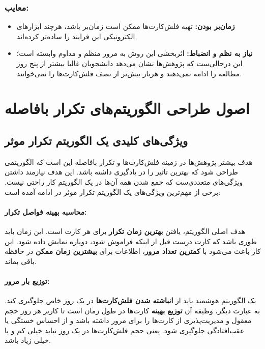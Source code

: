 \documentclass[12pt]{report}
\begin{document}
\subsection*{معایب:}
\begin{itemize}
    \item \textbf{زمان‌بر بودن:} تهیه فلش‌کارت‌ها ممکن است زمان‌بر باشد، هرچند ابزارهای الکترونیکی این فرایند را ساده‌تر کرده‌اند.
    \item \textbf{نیاز به نظم و انضباط:} اثربخشی این روش به مرور منظم و مداوم وابسته است؛
        این درحالی‌ست که پژوهش‌ها نشان می‌دهد دانشجویان غالبا بیشتر از پنج روز مطالعه را ادامه نمی‌دهند
        و هربار بیش‌تر از نصف فلش‌کارت‌ها را نمی‌خوانند.\cite{karl}
\end{itemize}

\chapter{اصول طراحی الگوریتم‌های تکرار بافاصله}

\section{ویژگی‌های کلیدی یک الگوریتم تکرار موثر}

هدف بیشتر پژوهش‌ها در زمینه فلش‌کارت‌ها و تکرار بافاصله این است که
الگوریتمی طراحی  شود که بهترین تاثیر را در یادگیری داشته باشد.
این هدف نیازمند داشتن ویژگی‌های متعددی‌ست که جمع شدن همه آن‌ها در یک الگوریتم کار راحتی نیست.
برخی از مهم‌ترین ویژگی‌های یک الگوریتم تکرار موثر در ادامه آمده است:

\subsubsection{محاسبه بهینه فواصل تکرار:} هدف اصلی الگوریتم، یافتن \textbf{بهترین زمان تکرار} برای هر کارت است. این زمان باید طوری باشد که کارت درست قبل از اینکه فراموش شود، دوباره نمایش داده شود. این کار باعث می‌شود با \textbf{کمترین تعداد مرور}، اطلاعات برای \textbf{بیشترین زمان ممکن} در حافظه باقی بماند.

\subsubsection{توزیع بار مرور:} یک الگوریتم هوشمند باید از \textbf{انباشته شدن فلش‌کارت‌ها} در یک روز خاص جلوگیری کند. به عبارت دیگر، وظیفه آن \textbf{توزیع بهینه} کارت‌ها در طول زمان است تا کاربر هر روز حجم معقول و مدیریت‌پذیری از کارت‌ها را برای مرور داشته باشد و از احساس خستگی یا عقب‌افتادگی جلوگیری شود. یعنی حجم فلش‌کارت‌ها در یک روز نباید خیلی کم و یا خیلی زیاد باشد.
\end{document}
